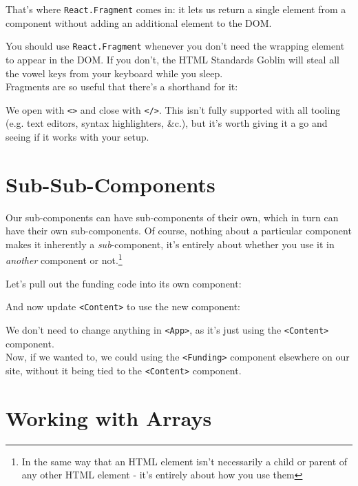 That's where \texttt{React.Fragment} comes in: it lets us return a single element from a component without adding an additional element to the DOM.


You should use \texttt{React.Fragment} whenever you don't need the wrapping element to appear in the DOM. If you don't, the HTML Standards Goblin will steal all the vowel keys from your keyboard while you sleep.
\\

Fragments are so useful that there's a shorthand for it:


We open with \texttt{<>} and close with \texttt{</>}. This isn't fully supported with all tooling (e.g. text editors, syntax highlighters, \&c.), but it's worth giving it a go and seeing if it works with your setup.



\section{Sub-Sub-Components}

Our sub-components can have sub-components of their own, which in turn can have their own sub-components. Of course, nothing about a particular component makes it inherently a \textit{sub}-component, it's entirely about whether you use it in \textit{another} component or not.\footnote{In the same way that an HTML element isn't necessarily a child or parent of any other HTML element - it's entirely about how you use them}


\pagebreak


Let's pull out the funding code into its own component:


And now update \texttt{<Content>} to use the new component:


We don't need to change anything in \texttt{<App>}, as it's just using the \texttt{<Content>} component.
\\

Now, if we wanted to, we could using the \texttt{<Funding>} component elsewhere on our site, without it being tied to the \texttt{<Content>} component.


\section{Working with Arrays}


